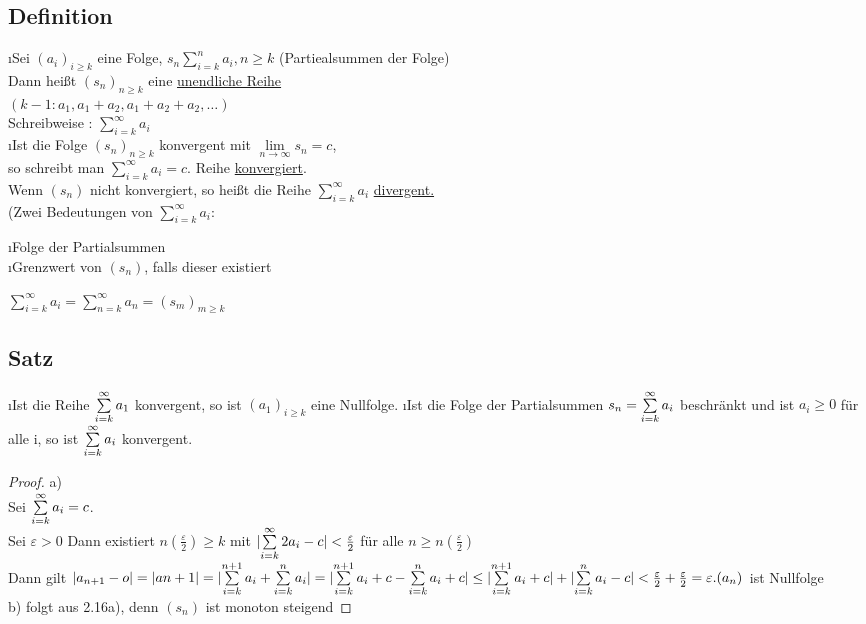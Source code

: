 \subsection{Definition}
\begin{enumerate}[a)]
\i Sei $(a_i)_{i \geq k}$ eine Folge, $s_n \sum\limits_{i = k}^{n} a_i , n \geq k$ (Partiealsummen der Folge)\\
Dann hei\ss t $(s_n)_{n \geq k}$ eine \underline{unendliche Reihe}\\
$(k-1: a_1, a_1+a_2, a_1 + a_2 + a_2,\ldots)$\\
Schreibweise : $\sum\limits_{i = k}^{\infty} a_i$\\
\i Ist die Folge $(s_n)_{n \geq k}$ konvergent mit $\lim\limits_{n \rightarrow \infty} s_n = c$,\\
so schreibt man $\sum\limits_{i = k}^{\infty} a_i =c.$ Reihe \underline{konvergiert}.\\
Wenn $(s_n)$ nicht konvergiert, so hei\ss t die Reihe $\sum\limits_{i =k}^{\infty} a_i$ \underline{divergent.}\\
(Zwei Bedeutungen von $\sum\limits_{i = k}^{\infty} a_i:$\\
\begin{enumerate}[-]
\i Folge der Partialsummen\\
\i Grenzwert von $(s_n)$, falls dieser existiert
\end{enumerate}
$\sum\limits_{i=k}^{\infty} a_i = \sum\limits_{n=k}^{\infty} a_n = (s_m)_{m \geq k}$
\end{enumerate}
\subsection{Satz}
\begin{enumerate}[a)]
\i Ist die Reihe $\sum\limits_{i=k}^{\infty} a_1$ konvergent, so ist $(a_1)_{i \geq k}$ eine Nullfolge.
\i Ist die Folge der Partialsummen $s_n = \sum\limits_{i=k}^{\infty} a_i$ beschränkt und ist $a_i \geq 0$ für alle i, so ist $\sum\limits_{i=k}^{\infty} a_i$ konvergent.
\begin{proof}
a)\\
Sei $\sum\limits_{i=k}^{\infty} a_i = c$.\\
Sei $\varepsilon > 0$ Dann existiert $n(\frac{\varepsilon}{2}) \geq k$ mit $\lvert \sum\limits_{i=k}^{\infty} 2{a_i - c} \rvert < \frac{\varepsilon	}{2}$ für alle $ n \geq n(\frac{\varepsilon}{2})$\\
Dann gilt $\lvert a_{n+1} -o \rvert = \lvert a{n+1} \rvert = \lvert \sum\limits_{i=k}^{n+1} a_i + \sum\limits_{i=k}^{n} a_i \rvert = \\
\lvert \sum\limits_{i=k}^{n+1} a_i+c-\sum\limits_{i=k}^{n} a_i +c \rvert \leq \lvert \sum\limits_{i=k}^{n+1} a_i+c \rvert+\lvert \sum\limits_{i=k}^{n} a_i -c \rvert <  \frac{\varepsilon}{2} + \frac{\varepsilon}{2} = \varepsilon.\\
(a_n)$ ist Nullfolge\\
b) folgt aus 2.16a), denn $(s_n)$ ist monoton steigend
\end{proof}
\end{enumerate}
